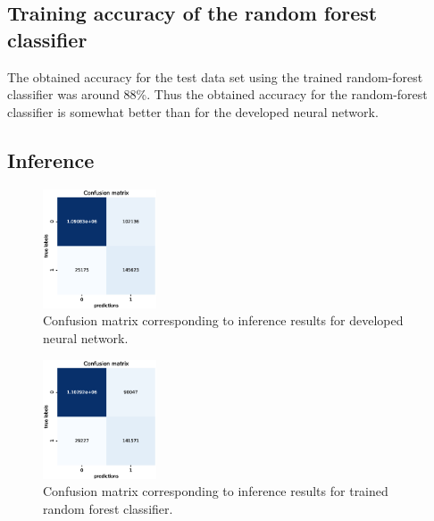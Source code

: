 \documentclass[aps,prb,10pt,twocolumn,groupedaddress]{revtex4-1}
\begin{document}
\subsection{Training accuracy of the random forest classifier}
\label{sec:results_random_forest_training}
The obtained accuracy for the test data set using the trained random-forest classifier was around 88\%. Thus the obtained accuracy for the random-forest classifier is somewhat better than for the developed neural network.

\subsection{Inference}
\label{sec:results_inference}
\begin{figure}[!h]
	\centering
	\includegraphics[width=0.3\textwidth]{images/confusion_matrix_nn_total_accuracy_91.eps}
	\caption{Confusion matrix corresponding to inference results for developed neural network.}
	\label{fig:confusion_matrix_nn}
\end{figure}
\begin{figure}[!h]
	\centering
	\includegraphics[width=0.3\textwidth]{images/confusion_matrix_rf_total_accuracy_92.eps}
	\caption{Confusion matrix corresponding to inference results for trained random forest classifier.}
	\label{fig:confusion_matrix_rf}
\end{figure}
\end{document}
